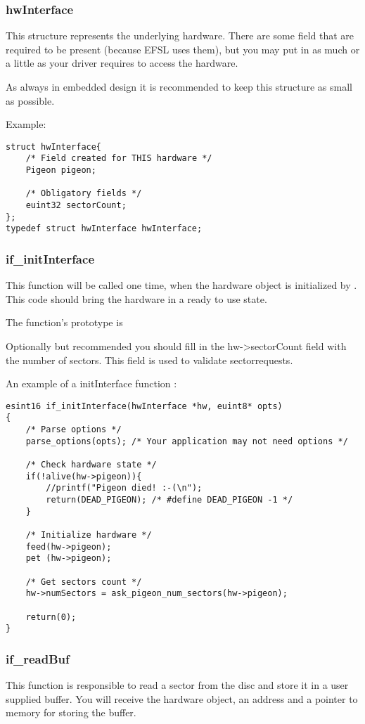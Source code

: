 \subsubsection{hwInterface}
This structure represents the underlying hardware. There are some field that are required
to be present (because EFSL uses them), but you may put in as much or a little as
your driver requires to access the hardware.

As always in embedded design it is recommended to keep this structure as small
as possible.

Example:
\begin{lstlisting}
struct hwInterface{
	/* Field created for THIS hardware */
	Pigeon pigeon;

	/* Obligatory fields */
	euint32 sectorCount;
};
typedef struct hwInterface hwInterface;
\end{lstlisting}

\subsubsection{if\_initInterface}
This function will be called one time, when the hardware object is initialized
by . This code should bring the hardware in a ready to use
state.

The function's prototype is\\

Optionally but recommended you should fill in the hw->sectorCount field with the number
of sectors. This field is used to validate sectorrequests.

An example of a initInterface function :
\begin{lstlisting}
esint16 if_initInterface(hwInterface *hw, euint8* opts)
{
	/* Parse options */
	parse_options(opts); /* Your application may not need options */

	/* Check hardware state */
	if(!alive(hw->pigeon)){
		//printf("Pigeon died! :-(\n");
		return(DEAD_PIGEON); /* #define DEAD_PIGEON -1 */
	}

	/* Initialize hardware */
	feed(hw->pigeon);
	pet (hw->pigeon);

	/* Get sectors count */
	hw->numSectors = ask_pigeon_num_sectors(hw->pigeon);

	return(0);
}
\end{lstlisting}

\subsubsection{if\_readBuf}
This function is responsible to read a sector from the disc and store it in a user supplied buffer. You will receive the hardware object, an address and a pointer to memory for storing
the buffer.

